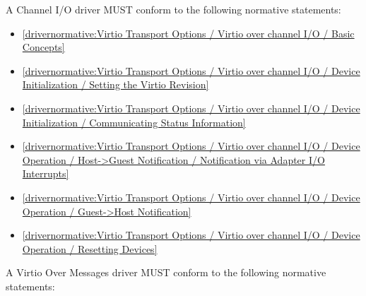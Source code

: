 \label{sec:Conformance / Driver Conformance / Channel I/O Driver Conformance}

A Channel I/O driver MUST conform to the following normative statements:

\begin{itemize}
\item \ref{drivernormative:Virtio Transport Options / Virtio over channel I/O / Basic Concepts}
\item \ref{drivernormative:Virtio Transport Options / Virtio over channel I/O / Device Initialization / Setting the Virtio Revision}
\item \ref{drivernormative:Virtio Transport Options / Virtio over channel I/O / Device Initialization / Communicating Status Information}
\item \ref{drivernormative:Virtio Transport Options / Virtio over channel I/O / Device Operation / Host->Guest Notification / Notification via Adapter I/O Interrupts}
\item \ref{drivernormative:Virtio Transport Options / Virtio over channel I/O / Device Operation / Guest->Host Notification}
\item \ref{drivernormative:Virtio Transport Options / Virtio over channel I/O / Device Operation / Resetting Devices}
\end{itemize}

\label{sec:Conformance / Driver Conformance / Virtio Over Messages Driver Conformance}

A Virtio Over Messages driver MUST conform to the following normative statements:

